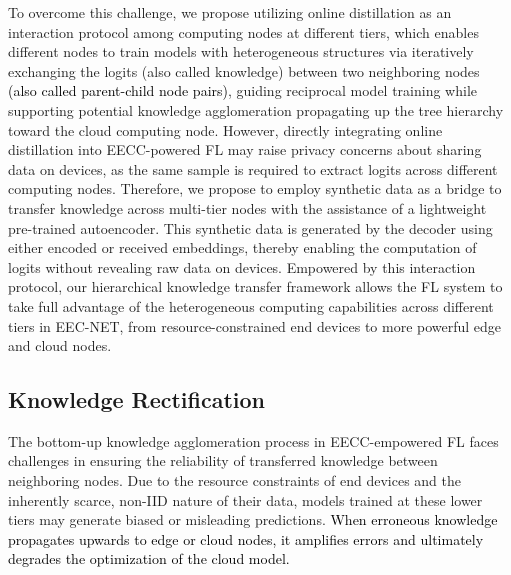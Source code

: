 \documentclass[10pt,journal]{IEEEtran}
\begin{document}
To overcome this challenge, we propose utilizing online distillation \cite{anil2018large,wang2021knowledge} as an interaction protocol among computing nodes at different tiers, which enables different nodes to train models with heterogeneous structures via iteratively exchanging the logits (also called knowledge) between two neighboring nodes \textcolor{black}{(also called parent-child node pairs)}, guiding reciprocal model training while supporting potential knowledge agglomeration propagating up the tree hierarchy toward the cloud computing node. 
However, directly integrating online distillation into EECC-powered FL may raise privacy concerns about sharing data on devices, as the same sample is required to extract logits across different computing nodes. Therefore, we propose to employ synthetic data as a bridge to transfer knowledge across multi-tier nodes with the assistance of a lightweight pre-trained autoencoder. This synthetic data is generated by the decoder using either encoded or received embeddings, thereby enabling the computation of logits without revealing raw data on devices. Empowered by this interaction protocol, our hierarchical knowledge transfer framework allows the FL system to take full advantage of the heterogeneous computing capabilities across different tiers in EEC-NET, from resource-constrained end devices to more powerful edge and cloud nodes.


\subsection{Knowledge Rectification}
The bottom-up knowledge agglomeration process in EECC-empowered FL faces challenges in ensuring the reliability of transferred knowledge between neighboring nodes. Due to the resource constraints of end devices and the inherently scarce, non-IID nature of their data, models trained at these lower tiers may generate biased or misleading predictions. \textcolor{black}{When erroneous knowledge propagates upwards to edge or cloud nodes, it amplifies errors and ultimately degrades the optimization of the cloud model.}


\end{document}
